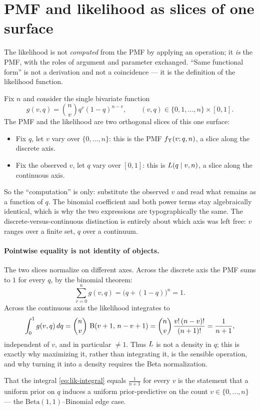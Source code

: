 \section{PMF and likelihood as slices of one surface}
\label{sec:slices}

The likelihood is not \emph{computed} from the PMF by applying an operation; it
\emph{is} the PMF, with the roles of argument and parameter exchanged.
``Same functional form'' is not a derivation and not a coincidence --- it is the
definition of the likelihood function.

Fix $n$ and consider the single bivariate function
\begin{equation}
  g(v, q) = \binom{n}{v} q^v (1-q)^{n-v},
  \qquad (v, q) \in \{0,1,\dots,n\} \times [0,1].
\end{equation}
The PMF and the likelihood are two orthogonal slices of this one surface:
\begin{itemize}[nosep]
  \item Fix $q$, let $v$ vary over $\{0,\dots,n\}$: this is the PMF
    $f_\Upsilon(v; q, n)$, a slice along the discrete axis.
  \item Fix the observed $v$, let $q$ vary over $[0,1]$: this is
    $L(q \mid v, n)$, a slice along the continuous axis.
\end{itemize}
So the ``computation'' is only: substitute the observed $v$ and read what
remains as a function of $q$. The binomial coefficient and both power terms stay
algebraically identical, which is why the two expressions are typographically
the same. The discrete-versus-continuous distinction is entirely about which
axis was left free: $v$ ranges over a finite set, $q$ over a continuum.

\paragraph{Pointwise equality is not identity of objects.}
The two slices normalize on different axes. Across the discrete axis the PMF
sums to $1$ for every $q$, by the binomial theorem:
\begin{equation}
  \sum_{v=0}^{n} g(v, q) = \bigl(q + (1-q)\bigr)^n = 1.
\end{equation}
Across the continuous axis the likelihood integrates to
\begin{equation}
  \int_0^1 g(v, q)\, dq
  = \binom{n}{v}\, \operatorname{B}(v+1,\, n-v+1)
  = \binom{n}{v}\, \frac{v!\,(n-v)!}{(n+1)!}
  = \frac{1}{n+1},
  \label{eq:lik-integral}
\end{equation}
independent of $v$, and in particular $\neq 1$. Thus $L$ is not a density in
$q$; this is exactly why maximizing it, rather than integrating it, is the
sensible operation, and why turning it into a density requires the Beta
normalization.

\begin{remark}
That the integral \eqref{eq:lik-integral} equals $\tfrac{1}{n+1}$ for every $v$
is the statement that a uniform prior on $q$ induces a uniform prior-predictive
on the count $v \in \{0,\dots,n\}$ --- the $\mathrm{Beta}(1,1)$--Binomial edge
case.
\end{remark}
